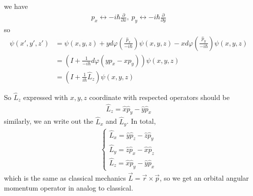 \documentclass[UTF8,12pt]{article} %
\begin{document}
we have
\begin{align}
p_{x} \leftrightarrow -i\hbar\frac{\partial}{\partial x},~ p_{y} \leftrightarrow -i\hbar\frac{\partial}{\partial y}
\end{align}
so
\begin{align}
\psi(x', y', z') &= \psi(x,y,z) + yd\varphi\left(\frac{\hat{p}_{x}}{-i\hbar}\right)\psi(x,y,z) - xd\varphi\left(\frac{\hat{p}_{y}}{-i\hbar}\right)\psi(x,y,z) \\
&= \left(I + \frac{1}{-i\hbar}d\varphi(yp_{x} - xp_{y})\right) \psi(x,y,z) \\
&= \left(I + \frac{1}{i\hbar}\hat{L}_{z}\right) \psi(x,y,z)
\end{align}

So $\hat{L}_{z}$ expressed with $x,y,z$ coordinate with respected operators should be
\begin{align}
\hat{L}_{z} = \hat{x}\hat{p}_{y} - \hat{y}\hat{p}_{x}
\end{align}
similarly, we an write out the $\hat{L}_{x}$ and $\hat{L}_{y}$. In total,
\begin{align}
\boxed{\begin{cases}
\hat{L}_{x} = \hat{y}\hat{p}_{z} - \hat{z}\hat{p}_{y} \\
\hat{L}_{y} = \hat{z}\hat{p}_{x} - \hat{x}\hat{p}_{z} \\
\hat{L}_{z} = \hat{x}\hat{p}_{y} - \hat{y}\hat{p}_{x}
\end{cases}}
\end{align}
which is the same as classical mechanics $\vec{L} = \vec{r} \times \vec{p}$, so we get an orbital angular momentum operator in analog to classical.
\end{document}
